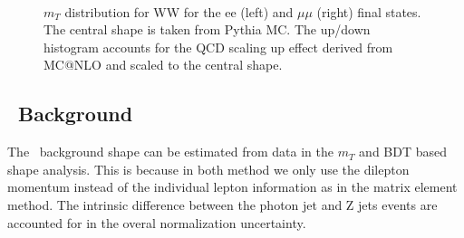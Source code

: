 \begin{figure}[!htbp]
\begin{center}
\\
\caption{$m_T$ distribution for WW for the ee (left) and $\mu\mu$ (right) final states. 
The central shape is taken from Pythia MC. The up/down histogram accounts for the QCD scaling up effect
derived from MC@NLO and scaled to the central shape. 
}
\label{fig:wwnlosyst_hzz}
\end{center}
\end{figure}

\subsection{\dyll\  Background}

The \dyll\  background shape can be estimated from data in the $m_T$ and BDT based 
shape analysis. This is because in both method we only use the dilepton momentum 
instead of the individual lepton information as in the matrix element method. 
The intrinsic difference between the photon jet and Z jets events are 
accounted for in the overal normalization uncertainty.




